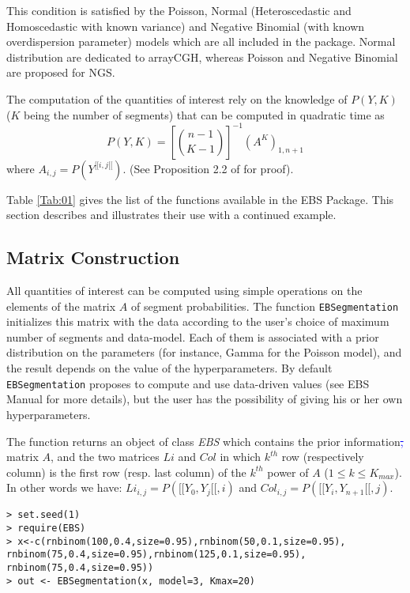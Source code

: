 \documentclass{bioinfo}
\newcommand{\SR}[2]{{\textcolor{blue}{\sout{#1}{#2}}}}
\begin{document}
\begin{methods}
This condition is satisfied by the Poisson,
Normal (Heteroscedastic and Homoscedastic with known variance) and
Negative Binomial (with known overdispersion parameter) models which are all included in the
  package. Normal distribution are dedicated to arrayCGH, whereas
Poisson and Negative Binomial are proposed for NGS.

The computation of the quantities of interest rely on the knowledge of $P(Y,K)$
($K$ being the number of segments) that can be computed in quadratic
time as
\begin{equation}
 P(Y,K) = \left[{n-1} \choose{K-1} \right]^{-1} \left(A^K \right)_{1,n+1} \label{Proba}
\end{equation} 
where $A_{i,j}=P(Y^{[\![i,j[\![})$. (See Proposition 2.2
                of \cite{rigaill_exact_2011} for proof). \newline


Table \ref{Tab:01} gives the list of the functions available in the EBS Package. This section describes and illustrates their use with a continued example. 

\subsection{Matrix Construction}

All quantities of interest can be computed using simple operations on the elements of the matrix $A$ of segment probabilities. The function \texttt{EBSegmentation} initializes this matrix with the data according to the user's choice of maximum number of segments and data-model. Each of them is associated with a prior distribution on the parameters (for instance, Gamma for the Poisson model), and the result depends on the value of the hyperparameters. By default \texttt{EBSegmentation} proposes to compute and use data-driven values (see EBS Manual for more details), but the user has the possibility of giving his or her own hyperparameters.

The function returns an object of class \textit{EBS} which contains
the prior information\SR{,}{} matrix $A$, and the two matrices $Li$
and $Col$ in which $k^{th}$ row (respectively column) is the first row
(resp. last column) of the $k^{th}$ power of $A$ ($1\leq k \leq
K_{max}$).  In other words we have: $Li_{i,j}=P([\![Y_0,Y_j[\![,i)$
        and $Col_{i,j}=P([\![Y_i,Y_{n+1}[\![,j)$.

\begin{verbatim}
> set.seed(1)
> require(EBS)
> x<-c(rnbinom(100,0.4,size=0.95),rnbinom(50,0.1,size=0.95),
rnbinom(75,0.4,size=0.95),rnbinom(125,0.1,size=0.95),
rnbinom(75,0.4,size=0.95))
> out <- EBSegmentation(x, model=3, Kmax=20)
\end{verbatim}



\end{methods}
\end{document}
